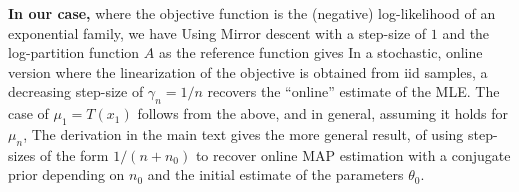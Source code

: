 \begin{subappendices}
{\bf In our case,} where the objective function is the (negative) log-likelihood of an exponential family, we have
Using Mirror descent with a step-size of $1$ and the log-partition function $A$ as the reference function gives
In a stochastic, online version 
where the linearization of the objective is obtained from iid samples, 
a decreasing step-size of $\gamma_n = 1/n$ recovers the ``online'' estimate of the MLE.
The case of $\mu_1 = T(x_1)$ follows from the above, 
and in general, assuming it holds for $\mu_n$, 
The derivation in the main text gives the more general result, 
of using step-sizes of the form $1/(n+n_0)$ to recover online MAP estimation 
with a conjugate prior depending on $n_0$ and the initial estimate of the parameters $\theta_0$.

	
\end{subappendices}




\iffalse
